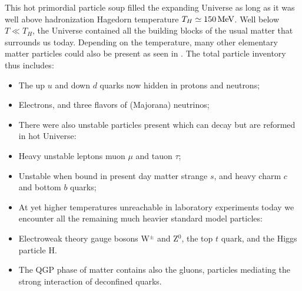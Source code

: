 This hot primordial particle soup filled the expanding Universe as long as it was well above hadronization Hagedorn temperature $T_H\simeq 150\text{\,MeV}$. Well below $T\ll T_H$, the Universe contained all the building blocks of the usual matter that surrounds us today. Depending on the temperature, many other elementary matter particles could also be present as seen in . The total particle inventory thus includes:
\begin{itemize}
\item The up $u$ and down $d$ quarks now hidden in protons and neutrons;
\item Electrons, and  three flavors  of (Majorana) neutrinos;\\[-0.2cm]
%
\item[] There were also unstable particles present which can decay but are reformed in hot Universe:\\[-0.2cm]
%
\item Heavy unstable leptons muon $\mu$ and tauon $\tau$;
\item Unstable when bound in present day matter strange $s$, and heavy charm $c$ and bottom $b$ quarks;\\[-0.2cm]
%
\item[] At yet higher temperatures unreachable in laboratory experiments today we encounter all the remaining much heavier standard model particles:\\[-0.2cm]
% 
\item Electroweak theory gauge bosons W$^\pm$ and Z$^0$, the top $t$ quark, and the Higgs particle H.
\item The QGP phase of matter contains also the gluons, particles mediating the strong interaction of deconfined quarks.
\end{itemize}


